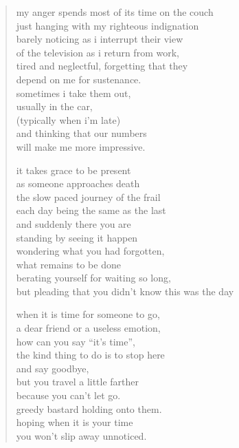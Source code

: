 
\begin{verse}
my anger spends most of its time on the couch \\
just hanging with my righteous indignation \\
barely noticing as i interrupt their view \\
of the television as i return from work, \\
tired and neglectful, forgetting that they \\
depend on me for sustenance. \\
sometimes i take them out, \\
usually in the car, \\
(typically when i’m late) \\
and thinking that our numbers \\
will make me more impressive.

it takes grace to be present  \\
as someone approaches death \\
the slow paced journey of the frail \\
each day being the same as the last \\
and suddenly there you are \\
standing by seeing it happen \\
wondering what you had forgotten, \\
what remains to be done \\
berating yourself for waiting so long, \\
but pleading that you didn’t know this was the day

when it is time for someone to go, \\
a dear friend or a useless emotion, \\
how can you say ``it’s time'', \\
the kind thing to do is to stop here \\
and say goodbye, \\
but you travel a little farther \\
because you can’t let go. \\
greedy bastard holding onto them. \\
hoping when it is your time \\
you won’t slip away unnoticed.
\end{verse}
